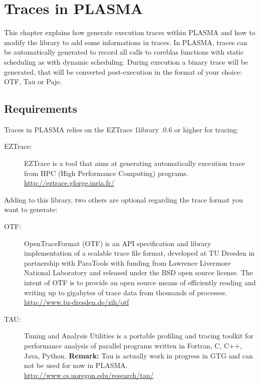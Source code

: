 
\chapter{Traces in PLASMA}

This chapter explains how generate execution traces within PLASMA and
how to modify the library to add some informations in traces.
In PLASMA, traces can be automatically generated to record all calls
to coreblas functions with static scheduling as with dynamic
scheduling. During execution a binary trace will be generated, that
will be converted post-execution in the format of your choice: OTF, Tau or
Paje.

\section{Requirements}

Traces in PLASMA relies on the {\sc EZTrace} 1library .0.6 or higher for tracing:
\begin{description}
  \item[{\sc EZTrace}:] EZTrace is a tool that aims at generating
    automatically execution trace from HPC (High Performance Computing)
    programs.\newline
    \url{http://eztrace.gforge.inria.fr/}
\end{description}

Adding to this library, two others are optional regarding the
trace format you want to generate:
\begin{description}
\item[{\sc OTF}:] OpenTraceFormat (OTF) is an API specification and
  library implementation of a scalable trace file format, developed at
  TU Dresden in partnership with ParaTools with funding from Lawrence
  Livermore National Laboratory and released under the BSD open source
  license. The intent of OTF is to provide an open source means of
  efficiently reading and writing up to gigabytes of trace data from
  thousands of processes.\newline
  \url{http://www.tu-dresden.de/zih/otf}
\item[{\sc TAU}:] Tuning and Analysis Utilities is a portable profiling
  and tracing toolkit for performance analysis of parallel programs
  written in Fortran, C, C++, Java, Python.\newline
  {\bf Remark:} Tau is actually work in progress in GTG and can not be used
  for now in PLASMA.\newline
  \url{http://www.cs.uoregon.edu/research/tau/}
\end{description}

